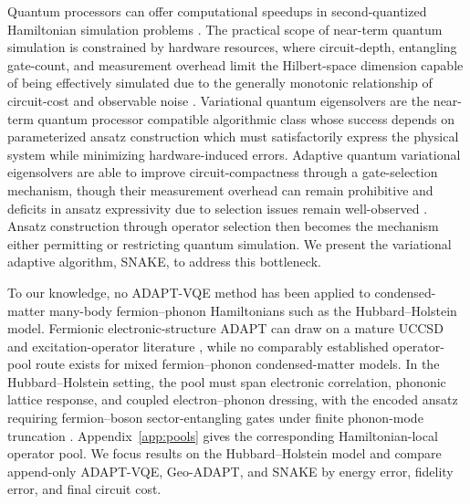 \documentclass[
  reprint,
  amsmath,
  amssymb,
  aps,
  pra,
  nofootinbib,
  superscriptaddress,
  floatfix
]{revtex4-2}
\begin{document}
Quantum processors can offer computational speedups in second-quantized Hamiltonian simulation problems \cite{Lloyd1996,AspuruGuzik2005}. The practical scope of near-term quantum simulation is constrained by hardware resources, where circuit-depth, entangling gate-count, and measurement overhead limit the Hilbert-space dimension capable of being effectively simulated due to the generally monotonic relationship of circuit-cost and observable noise \cite{Preskill2018NISQ,Cerezo2021VQA,Huggins2021Measurements}. Variational quantum eigensolvers are the near-term quantum processor compatible algorithmic class whose success depends on parameterized ansatz construction which must satisfactorily express the physical system while minimizing hardware-induced errors.  Adaptive quantum variational eigensolvers are able to improve circuit-compactness through a gate-selection mechanism, though their measurement overhead can remain prohibitive and deficits in ansatz expressivity due to selection issues remain well-observed \cite{Grimsley2019,Tang2021,Yordanov2021,Feniou2023ADAPT,Ikhtiarudin2025ShotEfficient}.  Ansatz construction through operator selection then becomes the mechanism either permitting or restricting quantum simulation. We present the variational adaptive algorithm, SNAKE, to address this bottleneck.


To our knowledge, no ADAPT-VQE method has been applied to condensed-matter many-body fermion--phonon Hamiltonians such as the Hubbard--Holstein model. Fermionic electronic-structure ADAPT can draw on a mature UCCSD and excitation-operator literature \cite{Romero2018UCC,Grimsley2019}, while no comparably established operator-pool route exists for mixed fermion--phonon condensed-matter models. In the Hubbard--Holstein setting, the pool must span electronic correlation, phononic lattice response, and coupled electron--phonon dressing, with the encoded ansatz requiring fermion--boson sector-entangling gates under finite phonon-mode truncation \cite{Hubbard1963,Holstein1959a,Holstein1959b}. Appendix~\ref{app:pools} gives the corresponding Hamiltonian-local operator pool. We focus results on the Hubbard--Holstein model and compare append-only ADAPT-VQE, Geo-ADAPT, and SNAKE by energy error, fidelity error, and final circuit cost.
\end{document}
